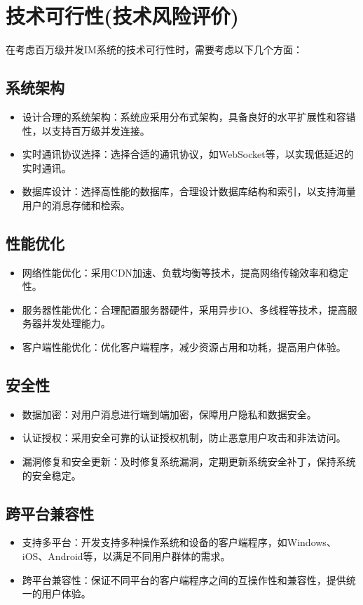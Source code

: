 \documentclass[12pt]{article}
\begin{document}
	\section{技术可行性(技术风险评价)}

	在考虑百万级并发IM系统的技术可行性时，需要考虑以下几个方面：
	
	\subsection{系统架构}
	\begin{itemize}
		\item 设计合理的系统架构：系统应采用分布式架构，具备良好的水平扩展性和容错性，以支持百万级并发连接。
		\item 实时通讯协议选择：选择合适的通讯协议，如WebSocket等，以实现低延迟的实时通讯。
		\item 数据库设计：选择高性能的数据库，合理设计数据库结构和索引，以支持海量用户的消息存储和检索。
	\end{itemize}
	
	\subsection{性能优化}
	\begin{itemize}
		\item 网络性能优化：采用CDN加速、负载均衡等技术，提高网络传输效率和稳定性。
		\item 服务器性能优化：合理配置服务器硬件，采用异步IO、多线程等技术，提高服务器并发处理能力。
		\item 客户端性能优化：优化客户端程序，减少资源占用和功耗，提高用户体验。
	\end{itemize}
	
	\subsection{安全性}
	\begin{itemize}
		\item 数据加密：对用户消息进行端到端加密，保障用户隐私和数据安全。
		\item 认证授权：采用安全可靠的认证授权机制，防止恶意用户攻击和非法访问。
		\item 漏洞修复和安全更新：及时修复系统漏洞，定期更新系统安全补丁，保持系统的安全稳定。
	\end{itemize}
	
	\subsection{跨平台兼容性}
	\begin{itemize}
		\item 支持多平台：开发支持多种操作系统和设备的客户端程序，如Windows、iOS、Android等，以满足不同用户群体的需求。
		\item 跨平台兼容性：保证不同平台的客户端程序之间的互操作性和兼容性，提供统一的用户体验。
	\end{itemize}
\end{document}
